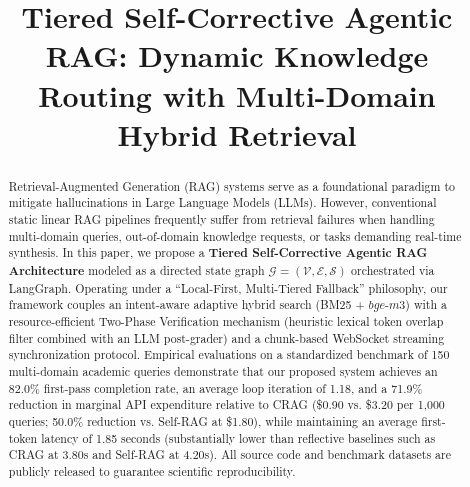 \documentclass[conference]{IEEEtran}
\begin{document}
\raggedbottom

\title{Tiered Self-Corrective Agentic RAG: Dynamic Knowledge Routing with Multi-Domain Hybrid Retrieval}

\author{
  \and
}

\maketitle

\begin{abstract}
Retrieval-Augmented Generation (RAG) systems serve as a foundational paradigm to mitigate hallucinations in Large Language Models (LLMs). However, conventional static linear RAG pipelines frequently suffer from retrieval failures when handling multi-domain queries, out-of-domain knowledge requests, or tasks demanding real-time synthesis. In this paper, we propose a \textbf{Tiered Self-Corrective Agentic RAG Architecture} modeled as a directed state graph $\mathcal{G} = (\mathcal{V}, \mathcal{E}, \mathcal{S})$ orchestrated via LangGraph. Operating under a ``Local-First, Multi-Tiered Fallback'' philosophy, our framework couples an intent-aware adaptive hybrid search (BM25 + $bge\text{-}m3$) with a resource-efficient Two-Phase Verification mechanism (heuristic lexical token overlap filter combined with an LLM post-grader) and a chunk-based WebSocket streaming synchronization protocol. Empirical evaluations on a standardized benchmark of 150 multi-domain academic queries demonstrate that our proposed system achieves an 82.0\% first-pass completion rate, an average loop iteration of 1.18, and a 71.9\% reduction in marginal API expenditure relative to CRAG (\$0.90 vs. \$3.20 per 1,000 queries; 50.0\% reduction vs. Self-RAG at \$1.80), while maintaining an average first-token latency of 1.85 seconds (substantially lower than reflective baselines such as CRAG at 3.80s and Self-RAG at 4.20s). All source code and benchmark datasets are publicly released to guarantee scientific reproducibility.
\end{abstract}
\end{document}
